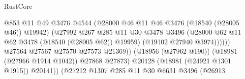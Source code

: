 \begin{lexlean}{RustCore}
\begin{coremodule}
                                                    @853
                                                    @11
                                                    @49
                                                    @3476
                                                    @4544
                                                    (@28000
                                                      @46
                                                      @11
                                                      @46
                                                      @3476
                                                      (@18540 (@28005 @46))
                                                      @19942)
                                                    (@27992
                                                      @267
                                                      @285
                                                      @11
                                                      @30
                                                      @3478
                                                      @3496
                                                      (@28000
                                                        @62
                                                        @11
                                                        @62
                                                        @3478
                                                        (@18540 (@28005 @62))
                                                        @19959)
                                                      (@19102 @27940 @3974))))))
                                            @27564
                                            @27567
                                            @27570
                                            @27573
                                            @21369))
                                        (@18956 (@27962 @190))
                                        (@18981 (@27966 @1914 @1042))
                                        @27868
                                        @27873)
                                      @20128
                                      (@18981 (@24921 @1301 @1915))
                                      @20141))
                                  (@27212
                                    @1307
                                    @285
                                    @11
                                    @30
                                    @6631
                                    @3496
                                    (@26913

\end{coremodule}
\end{lexlean}
